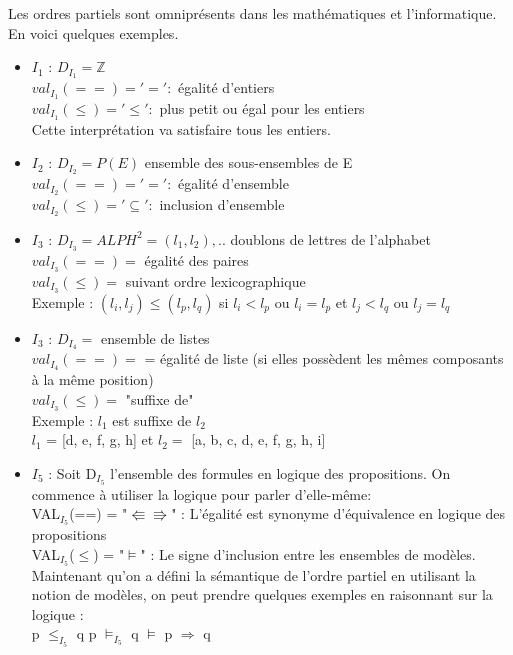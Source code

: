 {Les ordres partiels sont omniprésents dans les mathématiques et l'informatique.
En voici quelques exemples.
\begin{itemize}
\item \underline{$I_{1}$} : $D_{I_{1}} =  \mathbb{Z}$ \\
$ val_{I_{1}}(==) = '=' :$ égalité d'entiers \\
$ val_{I_{1}}(\leq) = '\leq' :$ plus petit ou égal pour les entiers\\
Cette interprétation va satisfaire tous les entiers.
\item \underline{$I_{2}$} : $D_{I_{2}} =  P(E)$ ensemble des sous-ensembles de E\\
$ val_{I_{2}}(==) = '=' :$ égalité d'ensemble \\
$ val_{I_{2}}(\leq) = '\subseteq' :$ inclusion d'ensemble
\item \underline{$I_{3}$} : $D_{I_{3}} = ALPH^{2} = {(l_{1},l_{2}),..}$ doublons de lettres de l'alphabet\\
$ val_{I_{3}}(==) = $ égalité des paires \\
$ val_{I_{3}}(\leq) =$ suivant ordre lexicographique\\
Exemple : $(l_{i},l_{j}) \leq (l_{p},l_{q})$ si $ l_{i} < l_{p}$ ou $ l_{i} = l_{p}$ et $ l_{j} < l_{q}$ ou $ l_{j} = l_{q}$
\item \underline{$I_{3}$} : $D_{I_{4}} =$ ensemble de listes\\
$ val_{I_{4}}(==) = $ = égalité de liste (si elles possèdent les mêmes composants à la même position)\\
$ val_{I_{3}}(\leq) =$ "suffixe de" \\
Exemple : $l_{1} $ est suffixe de $l_{2}$ \\
$l_{1} $ = [d, e, f, g, h] et $l_{2} =$ [a, b, c, d, e, f, g, h, i]
\item \underline{$I_{5}$} : Soit D$_{I_{5}}$ l'ensemble des formules en logique des propositions. On commence à utiliser la logique pour parler d'elle-même:\\
VAL$_{I_{5}}$(==) = "$\Lleftarrow \Rrightarrow$" : L'égalité est synonyme d'équivalence en logique des propositions \\
VAL$_{I_{5}}$($\leq$) = "$\models$" : Le signe d'inclusion entre les ensembles de modèles.
Maintenant qu'on a défini la sémantique de l'ordre partiel en utilisant la notion de modèles, on peut prendre quelques exemples en raisonnant sur la logique :\\
p $\leq_{I_{5}}$ q   \hspace{1.5cm} p $\models_{I_{5}}$ q \hspace{1.5cm} $\models$ p $\Rightarrow$ q

\end{itemize}}
